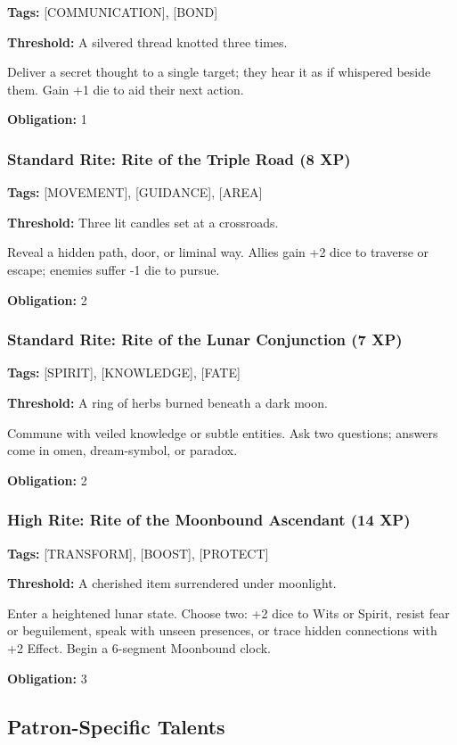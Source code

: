 \textbf{Tags:} [COMMUNICATION], [BOND]

\textbf{Threshold:} A silvered thread knotted three times.

Deliver a secret thought to a single target; they hear it as if whispered beside them. Gain +1 die to aid their next action.

\textbf{Obligation:} 1

\subsubsection{Standard Rite: Rite of the Triple Road (8 XP)}

\textbf{Tags:} [MOVEMENT], [GUIDANCE], [AREA]

\textbf{Threshold:} Three lit candles set at a crossroads.

Reveal a hidden path, door, or liminal way. Allies gain +2 dice to traverse or escape; enemies suffer -1 die to pursue.

\textbf{Obligation:} 2

\subsubsection{Standard Rite: Rite of the Lunar Conjunction (7 XP)}

\textbf{Tags:} [SPIRIT], [KNOWLEDGE], [FATE]

\textbf{Threshold:} A ring of herbs burned beneath a dark moon.

Commune with veiled knowledge or subtle entities. Ask two questions; answers come in omen, dream-symbol, or paradox.

\textbf{Obligation:} 2

\subsubsection{High Rite: Rite of the Moonbound Ascendant (14 XP)}

\textbf{Tags:} [TRANSFORM], [BOOST], [PROTECT]

\textbf{Threshold:} A cherished item surrendered under moonlight.

Enter a heightened lunar state. Choose two: +2 dice to Wits or Spirit, resist fear or beguilement, speak with unseen presences, or trace hidden connections with +2 Effect. Begin a 6-segment Moonbound clock.

\textbf{Obligation:} 3

\subsection{Patron-Specific Talents}

